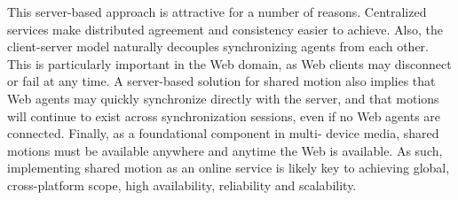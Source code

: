 This server-based approach is attractive for a number of reasons. Centralized
services make distributed agreement and consistency easier to achieve. Also,
the client-server model naturally decouples synchronizing agents from each
other. This is particularly important in the Web domain, as Web clients may
disconnect or fail at any time. A server-based solution for shared motion also
implies that Web agents may quickly synchronize directly with the server, and
that motions will continue to exist across synchronization sessions, even if
no Web agents are connected. Finally, as a foundational component in multi-
device media, shared motions must be available anywhere and anytime the Web is
available. As such, implementing shared motion as an online service is likely
key to achieving global, cross-platform scope, high availability, reliability
and scalability.




